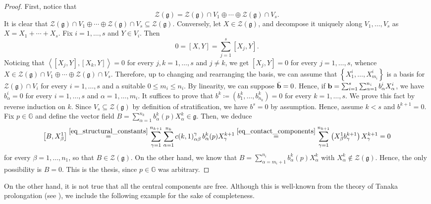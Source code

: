 \documentclass[11pt]{amsart}
\newcommand{\bb}{{\bf {b}}} %
\theoremstyle{plain}
\theoremstyle{definition}
\theoremstyle{remark}
\numberwithin{equation}{section}
\begin{document}
\begin{proof}
First, notice that $$\mathcal{Z}(\mathfrak{g})=\mathcal{Z}(\mathfrak{g})\cap V_1\oplus\cdots\oplus \mathcal{Z}(\mathfrak{g})\cap V_s.$$ It is clear that $\mathcal{Z}(\mathfrak{g})\cap V_1\oplus\cdots\oplus \mathcal{Z}(\mathfrak{g})\cap V_s \subseteq\mathcal{Z}(\mathfrak{g})$. Conversely, let $X\in \mathcal{Z}(\mathfrak{g})$, and decompose it uniquely along $V_1,\ldots,V_s$ as $X=X_1+\cdots+ X_s$. Fix $i=1,\ldots,s$ and $Y\in V_i$. Then 
\begin{equation*}
    0=[X,Y]=\sum_{j=1}^s[X_j,Y].
\end{equation*}
Noticing that $\left\langle[X_j,Y],[X_k,Y]\right\rangle=0$ for every $j,k=1,\ldots,s$ and $j\neq k$, we get $[X_j,Y]=0$ for every $j=1,\ldots,s$, whence $X\in \mathcal{Z}(\mathfrak{g})\cap V_1\oplus\cdots\oplus \mathcal{Z}(\mathfrak{g})\cap V_s$. 
Therefore, up to changing and rearranging the basis, we can assume that $\left\{X^i_1,\dots,X^i_{m_i}\right\}$ is a basis for $\mathcal{Z}(\mathfrak{g}) \cap V_i$ for every $i=1,\dots,s$ and a suitable $0 \leq m_i \leq n_i$. By linearity, we can suppose $\bar \bb=0$. Hence, if $\bb= \sum_{i=1}^s \sum_{\alpha=1}^{n_i} b^i_\alpha X^i_\alpha$, we have $b^i_\alpha=0$ for every $i=1,\dots,s$ and $\alpha=1,\dots,m_i$. It suffices to prove that $b^k \coloneqq \left(b^k_1,\dots,b^k_{n_k}\right)=0$ for every $k=1,\dots,s$. We prove this fact by reverse induction on $k$. Since $V_s \subseteq \mathcal{Z}(\mathfrak{g})$ by definition of stratification, we have $b^s=0$ by assumption. Hence, assume $k<s$ and $b^{k+1}=0$. Fix $p \in \mathbb{G}$ and define the vector field $B=\sum_{\alpha=1}^{n_k} b^k_\alpha(p) X^k_\alpha \in \mathfrak{g}$. Then, we deduce
\begin{equation*}
\left[B,X^1_\beta \right] \overset{\eqref{eq_structural_constants}}{=} \sum_{\gamma=1}^{n_{k+1}} \sum_{\alpha=1}^{n_k} c(k,1)^\gamma_{\alpha \beta} \, b^k_\alpha(p) X^{k+1}_\gamma \overset{\eqref{eq_contact_components}}{=} \sum_{\gamma=1}^{n_{k+1}} \left(X^1_\beta b^{k+1}_\gamma\right) X^{k+1}_\gamma =0
\end{equation*}
for every $\beta=1,\dots,n_1$, so that $B \in \mathcal{Z}(\mathfrak{g})$. On the other hand, we know that $B=\sum_{\alpha=m_i+1}^{n_i} b^k_\alpha(p) X^k_\alpha$ with $X^k_\alpha \notin \mathcal{Z}(\mathfrak{g})$. Hence, the only possibility is $B=0$. This is the thesis, since $p \in \mathbb{G}$ was arbitrary.
\end{proof}
On the other hand, it is not true that all the central components are free. Although this is well-known from the theory of Tanaka prolongation (see \cite{MR266258}), we include the following example for the sake of completeness.
\end{document}
